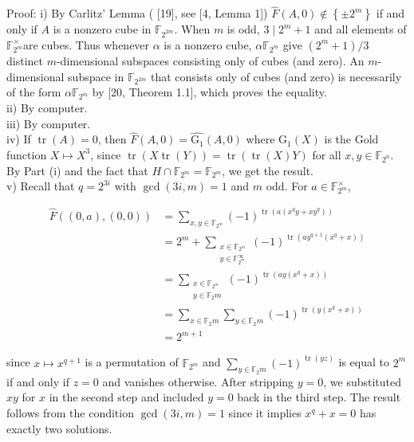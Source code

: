 \documentclass[10pt]{article}
\begin{document}
Proof: i) By Carlitz' Lemma ( [19], see [4, Lemma 1]) $\widehat{F}(A, 0) \notin\left\{ \pm 2^{m}\right\}$ if and only if $A$ is a nonzero cube in $\mathbb{F}_{2^{2 m}}$. When $m$ is odd, $3 \mid 2^{m}+1$ and all elements of $\mathbb{F}_{2^{m}}^{\times}$are cubes. Thus whenever $\alpha$ is a nonzero cube, $\alpha \mathbb{F}_{2^{m}}$ give $\left(2^{m}+1\right) / 3$ distinct $m$-dimensional subspaces consisting only of cubes (and zero). An $m$-dimensional subspace in $\mathbb{F}_{2^{2 m}}$ that consists only of cubes (and zero) is necessarily of the form $\alpha \mathbb{F}_{2^{m}}$ by [20, Theorem 1.1], which proves the equality.\\
ii) By computer.\\
iii) By computer.\\
iv) If $\operatorname{tr}(A)=0$, then $\widehat{F}(A, 0)=\widehat{\mathrm{G}_{1}}(A, 0)$ where $\mathrm{G}_{1}(X)$ is the Gold function $X \mapsto X^{3}$, since $\operatorname{tr}(X \operatorname{tr}(Y))= \operatorname{tr}(\operatorname{tr}(X) Y)$ for all $x, y \in \mathbb{F}_{2^{n}}$. By Part (i) and the fact that $H \cap \mathbb{F}_{2^{m}}=\mathbb{F}_{2^{m}}$, we get the result.\\
v) Recall that $q=2^{3 i}$ with $\operatorname{gcd}(3 i, m)=1$ and $m$ odd. For $a \in \mathbb{F}_{2^{m}}^{\times}$,

$$
\begin{aligned}
\widehat{F}((0, a),(0,0)) & =\sum_{x, y \in \mathbb{F}_{2^{m}}}(-1)^{\operatorname{tr}\left(a\left(x^{q} y+x y^{q}\right)\right)} \\
& =2^{m}+\sum_{\substack{x \in \mathbb{F}_{2^{m}} \\
y \in \mathbb{F}_{2^{m}}^{\infty}}}(-1)^{\operatorname{tr}\left(a y^{q+1}\left(x^{q}+x\right)\right)} \\
& =\sum_{\substack{x \in \mathbb{F}_{2^{m}} \\
y \in \mathbb{F}_{2} m}}(-1)^{\operatorname{tr}\left(a y\left(x^{q}+x\right)\right)} \\
& =\sum_{x \in \mathbb{F}_{2} m} \sum_{y \in \mathbb{F}_{2} m}(-1)^{\operatorname{tr}\left(y\left(x^{q}+x\right)\right)} \\
& =2^{m+1}
\end{aligned}
$$

since $x \mapsto x^{q+1}$ is a permutation of $\mathbb{F}_{2^{m}}$ and $\sum_{y \in \mathbb{F}_{2} m}(-1)^{\operatorname{tr}(y z)}$ is equal to $2^{m}$ if and only if $z=0$ and vanishes otherwise. After stripping $y=0$, we substituted $x y$ for $x$ in the second step and included $y=0$ back in the third step. The result follows from the condition $\operatorname{gcd}(3 i, m)=1$ since it implies $x^{q}+x=0$ has exactly two solutions.
\end{document}
